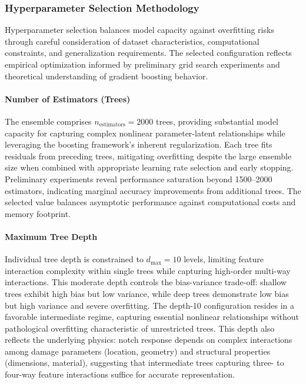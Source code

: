 \documentclass[12pt,a4paper]{report}
\begin{document}
\subsubsection{Hyperparameter Selection Methodology}

Hyperparameter selection balances model capacity against overfitting risks through careful consideration of dataset characteristics, computational constraints, and generalization requirements. The selected configuration reflects empirical optimization informed by preliminary grid search experiments and theoretical understanding of gradient boosting behavior.

\paragraph{Number of Estimators (Trees)} 
The ensemble comprises $n_{\text{estimators}} = 2000$ trees, providing substantial model capacity for capturing complex nonlinear parameter-latent relationships while leveraging the boosting framework's inherent regularization. Each tree fits residuals from preceding trees, mitigating overfitting despite the large ensemble size when combined with appropriate learning rate selection and early stopping. Preliminary experiments reveal performance saturation beyond 1500--2000 estimators, indicating marginal accuracy improvements from additional trees. The selected value balances asymptotic performance against computational costs and memory footprint.

\paragraph{Maximum Tree Depth} 
Individual tree depth is constrained to $d_{\text{max}} = 10$ levels, limiting feature interaction complexity within single trees while capturing high-order multi-way interactions. This moderate depth controls the bias-variance trade-off: shallow trees exhibit high bias but low variance, while deep trees demonstrate low bias but high variance and severe overfitting. The depth-10 configuration resides in a favorable intermediate regime, capturing essential nonlinear relationships without pathological overfitting characteristic of unrestricted trees. This depth also reflects the underlying physics: notch response depends on complex interactions among damage parameters (location, geometry) and structural properties (dimensions, material), suggesting that intermediate trees capturing three- to four-way feature interactions suffice for accurate representation.
\end{document}
